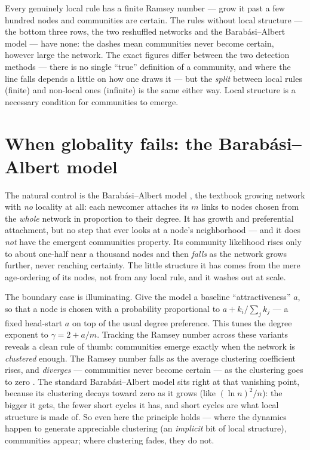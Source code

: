 Every genuinely local rule has a finite Ramsey number --- grow it past a few
hundred nodes and communities are certain. The rules without local structure ---
the bottom three rows, the two reshuffled networks and the Barab\'asi--Albert
model --- have none: the dashes mean communities never become certain, however
large the network. The exact figures differ between the
two detection methods --- there is no single ``true'' definition of a community,
and where the line falls depends a little on how one draws it --- but the
\emph{split} between local rules (finite) and non-local ones (infinite) is the
same either way. Local structure is a necessary condition for communities to
emerge.

\section{When globality fails: the Barab\'asi--Albert model}

The natural control is the Barab\'asi--Albert model \citep{barabasi1999}, the
textbook growing network with \emph{no} locality at all: each newcomer attaches
its $m$ links to nodes chosen from the \emph{whole} network in proportion to
their degree. It has growth and preferential attachment, but no step that ever
looks at a node's neighborhood --- and it does \emph{not} have the emergent
communities property. Its community likelihood rises only to about one-half near
a thousand nodes and then \emph{falls} as the network grows further, never
reaching certainty. The little structure it has comes from the mere age-ordering
of its nodes, not from any local rule, and it washes out at scale.

The boundary case is illuminating. Give the model a baseline ``attractiveness''
$a$, so that a node is chosen with a probability proportional to $a +
k_i/\sum_j k_j$ --- a fixed head-start $a$ on top of the usual degree preference.
This tunes the degree exponent to $\gamma=2+a/m$. Tracking the Ramsey number
across these variants reveals a clean rule of thumb: communities emerge exactly
when the network is \emph{clustered} enough. The Ramsey number falls as the
average clustering coefficient rises, and \emph{diverges} --- communities never
become certain --- as the clustering goes to zero \citep{vazquezcommunities2025}. The standard Barab\'asi--Albert
model sits right at that vanishing point, because its clustering decays toward
zero as it grows (like $(\ln n)^2/n$): the bigger it gets, the fewer short cycles
it has, and short cycles are what local structure is made of. So even here the
principle holds --- where the dynamics happen to generate appreciable clustering
(an \emph{implicit} bit of local structure), communities appear; where clustering
fades, they do not.

